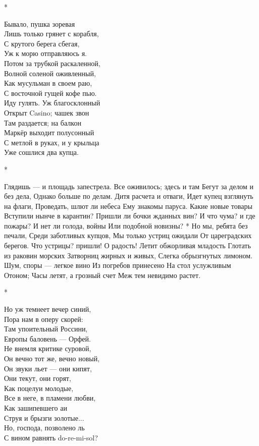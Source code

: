 *

Бывало, пушка зоревая\\
Лишь только грянет с корабля,\\
С крутого берега сбегая,\\
Уж к морю отправляюсь я.\\
Потом за трубкой раскаленной,\\
Волной соленой оживленный,\\
Как мусульман в своем раю,\\
С восточной гущей кофе пью.\\
Иду гулять. Уж благосклонный\\
Открыт Casino; чашек звон\\
Там раздается; на балкон\\
Маркёр выходит полусонный\\
С метлой в руках, и у крыльца\\
Уже сошлися два купца.

*

Глядишь — и площадь запестрела.
Все оживилось; здесь и там
Бегут за делом и без дела,
Однако больше по делам.
Дитя расчета и отваги,
Идет купец взглянуть на флаги,
Проведать, шлют ли небеса
Ему знакомы паруса.
Какие новые товары
Вступили нынче в карантин?
Пришли ли бочки жданных вин?
И что чума? и где пожары?
И нет ли голода, войны
Или подобной новизны?
*
Но мы, ребята без печали,
Среди заботливых купцов,
Мы только устриц ожидали
От цареградских берегов.
Что устрицы? пришли! О радость!
Летит обжорливая младость
Глотать из раковин морских
Затворниц жирных и живых,
Слегка обрызгнутых лимоном.
Шум, споры — легкое вино
Из погребов принесено
На стол услужливым Отоном;
Часы летят, а грозный счет
Меж тем невидимо растет.

*

Но уж темнеет вечер синий,\\
Пора нам в оперу скорей:\\
Там упоительный Россини,\\
Европы баловень — Орфей.\\
Не внемля критике суровой,\\
Он вечно тот же, вечно новый,\\
Он звуки льет — они кипят,\\
Они текут, они горят,\\
Как поцелуи молодые,\\
Все в неге, в пламени любви,\\
Как зашипевшего аи\\
Струя и брызги золотые...\\
Но, господа, позволено ль\\
С вином равнять do-re-mi-sol?

